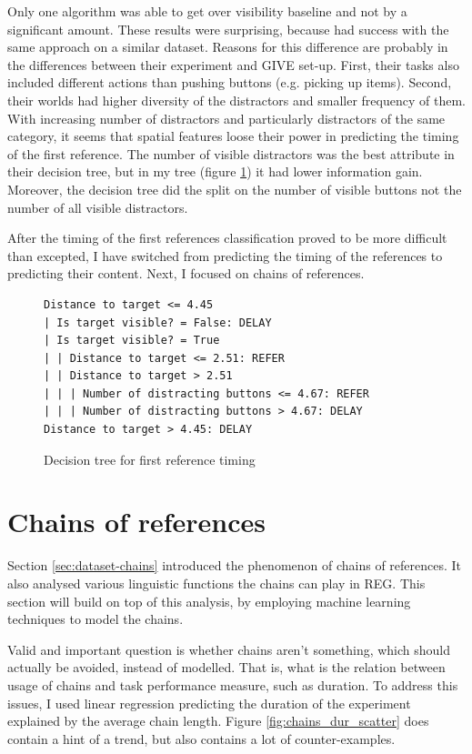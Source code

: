 Only one algorithm was able to get over visibility baseline and not by a significant amount. These results were surprising, because \citet{stoia2006sentence} had success with the same approach on a similar dataset. Reasons for this difference are probably in the differences between their experiment and GIVE set-up. First, their tasks also included different actions than pushing buttons (e.g. picking up items). Second, their worlds had higher diversity of the distractors and smaller frequency of them. With increasing number of distractors and particularly distractors of the same category, it seems that spatial features loose their power in predicting the timing of the first reference. The number of visible distractors was the best attribute in their decision tree, but in my tree (figure \ref{fig:dectree}) it had lower information gain. Moreover, the decision tree did the split on the number of visible buttons not the number of all visible distractors.

After the timing of the first references classification proved to be more difficult than excepted, I have switched from predicting the timing of the references to predicting their content. Next, I focused on chains of references.

\begin{figure}[!htbp]
 \centering
\small
\begin{verbatim}
Distance to target <= 4.45
| Is target visible? = False: DELAY
| Is target visible? = True
| | Distance to target <= 2.51: REFER
| | Distance to target > 2.51
| | | Number of distracting buttons <= 4.67: REFER
| | | Number of distracting buttons > 4.67: DELAY
Distance to target > 4.45: DELAY
\end{verbatim}
\caption{Decision tree for first reference timing}
\label{fig:dectree}
\end{figure}

\section{Chains of references}
Section \ref{sec:dataset-chains} introduced the phenomenon of chains of references. It also analysed various linguistic functions the chains can play in REG. This section will build on top of this analysis, by employing machine learning techniques to model the chains.

Valid and important question is whether chains aren't something, which should actually be avoided, instead of modelled. That is, what is the relation between usage of chains and task performance measure, such as duration. To address this issues, I used linear regression predicting the duration of the experiment explained by the average chain length. Figure \ref{fig:chains_dur_scatter} does contain a hint of a trend, but also contains a lot of counter-examples. 


